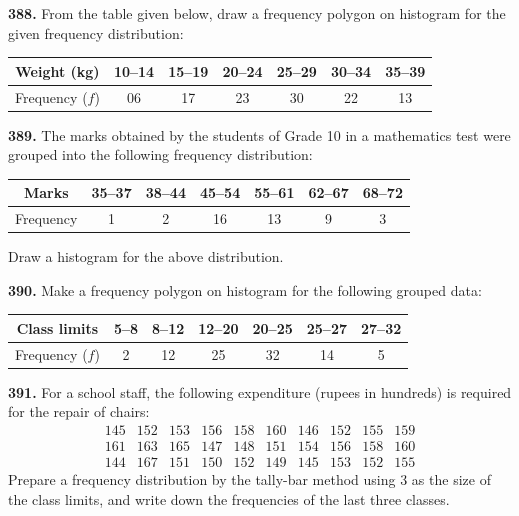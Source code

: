 \documentclass[11pt]{article}
\begin{document}
\bigskip
\noindent\textbf{388.} From the table given below, draw a frequency polygon on histogram for the given frequency distribution:

\begin{center}
\begin{tabular}{|c|c|c|c|c|c|c|}
\hline
Weight (kg) & 10--14 & 15--19 & 20--24 & 25--29 & 30--34 & 35--39 \\
\hline
Frequency ($f$) & 06 & 17 & 23 & 30 & 22 & 13 \\
\hline
\end{tabular}
\end{center}

\bigskip
\noindent\textbf{389.} The marks obtained by the students of Grade 10 in a mathematics test were grouped into the following frequency distribution:

\begin{center}
\begin{tabular}{|c|c|c|c|c|c|c|}
\hline
Marks & 35--37 & 38--44 & 45--54 & 55--61 & 62--67 & 68--72 \\
\hline
Frequency & 1 & 2 & 16 & 13 & 9 & 3 \\
\hline
\end{tabular}
\end{center}

Draw a histogram for the above distribution.

\bigskip
\noindent\textbf{390.} Make a frequency polygon on histogram for the following grouped data:

\begin{center}
\begin{tabular}{|c|c|c|c|c|c|c|}
\hline
Class limits & 5--8 & 8--12 & 12--20 & 20--25 & 25--27 & 27--32 \\
\hline
Frequency ($f$) & 2 & 12 & 25 & 32 & 14 & 5 \\
\hline
\end{tabular}
\end{center}

\bigskip
\noindent\textbf{391.} For a school staff, the following expenditure (rupees in hundreds) is required for the repair of chairs:
\[
\begin{array}{cccccccccc}
145 & 152 & 153 & 156 & 158 & 160 & 146 & 152 & 155 & 159 \\
161 & 163 & 165 & 147 & 148 & 151 & 154 & 156 & 158 & 160 \\
144 & 167 & 151 & 150 & 152 & 149 & 145 & 153 & 152 & 155
\end{array}
\]
Prepare a frequency distribution by the tally-bar method using 3 as the size of the class limits, and write down the frequencies of the last three classes.
\end{document}
